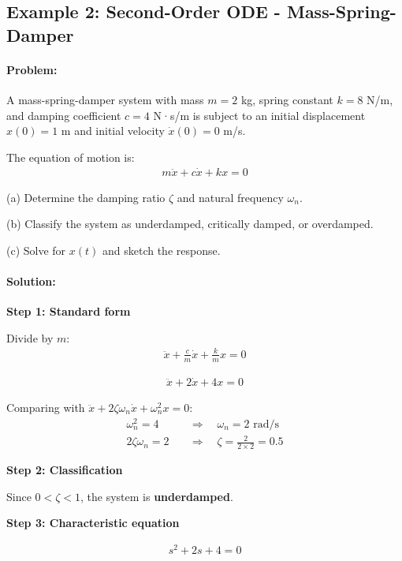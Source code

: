 \documentclass[11pt,a4paper]{article}
\begin{document}
\subsection{Example 2: Second-Order ODE - Mass-Spring-Damper}

\paragraph{Problem:} A mass-spring-damper system with mass $m = 2$ kg, spring constant $k = 8$ N/m, and damping coefficient $c = 4$ N·s/m is subject to an initial displacement $x(0) = 1$ m and initial velocity $\dot{x}(0) = 0$ m/s.

The equation of motion is:
\begin{align}
m\ddot{x} + c\dot{x} + kx = 0
\end{align}

(a) Determine the damping ratio $\zeta$ and natural frequency $\omega_n$.

(b) Classify the system as underdamped, critically damped, or overdamped.

(c) Solve for $x(t)$ and sketch the response.

\paragraph{Solution:}

\textbf{Step 1: Standard form}

Divide by $m$:
\begin{align}
\ddot{x} + \frac{c}{m}\dot{x} + \frac{k}{m}x = 0
\end{align}

\begin{align}
\ddot{x} + 2\dot{x} + 4x = 0
\end{align}

Comparing with $\ddot{x} + 2\zeta\omega_n\dot{x} + \omega_n^2 x = 0$:
\begin{align}
\omega_n^2 = 4 \quad &\Rightarrow \quad \omega_n = 2 \text{ rad/s} \\
2\zeta\omega_n = 2 \quad &\Rightarrow \quad \zeta = \frac{2}{2 \times 2} = 0.5
\end{align}

\textbf{Step 2: Classification}

Since $0 < \zeta < 1$, the system is \textbf{underdamped}.

\textbf{Step 3: Characteristic equation}

\begin{align}
s^2 + 2s + 4 = 0
\end{align}
\end{document}
